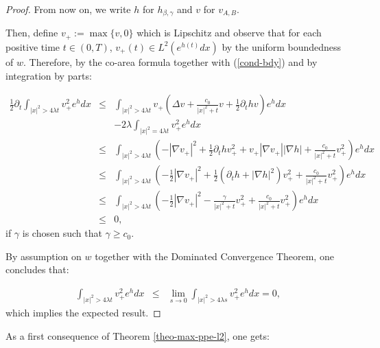 \documentclass[a4paper,11pt,reqno]{amsart}
\begin{document}
\begin{proof}
From now on, we write $h$ for $h_{\beta,\gamma}$ and $v$ for $v_{A,B}$.

Then, define $v_+:=\max\{v,0\}$ which is Lipschitz and observe that for each positive time $t\in(0,T)$, $v_+(t)\in L^2(e^{h(t)}dx)$ by the uniform boundedness of $w$. Therefore, by the co-area formula together with (\ref{cond-bdy}) and by integration by parts:

\begin{eqnarray*}
\frac{1}{2}\partial_t\int_{|x|^2>4\lambda t}v_+^2e^{h}dx&\leq&\int_{|x|^2>4\lambda t}v_+\left(\Delta v+\frac{c_0}{|x|^2+t} v+\frac{1}{2}\partial_thv\right)e^{h}dx\\
&&-2\lambda\int_{|x|^2=4\lambda t}v_+^2e^{h}dx\\
&\leq& \int_{|x|^2>4\lambda t}\left(-|\nabla v_+|^2+\frac{1}{2}\partial_thv_+^2+v_+|\nabla v_+||\nabla h|+\frac{c_0}{|x|^2+t} v_+^2\right)e^{h}dx\\
&\leq& \int_{|x|^2>4\lambda t}\left(-\frac{1}{2}|\nabla v_+|^2+\frac{1}{2}(\partial_th+|\nabla h|^2)v_+^2+\frac{c_0}{|x|^2+t} v_+^2\right)e^{h}dx\\
&\leq&\int_{|x|^2>4\lambda t}\left(-\frac{1}{2}|\nabla v_+|^2-\frac{\gamma}{|x|^2+t}v_+^2+\frac{c_0}{|x|^2+t} v_+^2\right)e^{h}dx\\
&\leq&0,
\end{eqnarray*}
if $\gamma$ is chosen such that $\gamma\geq c_0$.

By assumption on $w$ together with the Dominated Convergence Theorem, one concludes that:

\begin{eqnarray*}
\int_{|x|^2>4\lambda t}v_+^2e^{h}dx&\leq&\lim_{s\rightarrow 0}\int_{|x|^2>4\lambda s}v_+^2e^{h}dx=0,
\end{eqnarray*}
which implies the expected result. 
 

\end{proof}
As a first consequence of Theorem \ref{theo-max-ppe-l2}, one gets:
\end{document}
